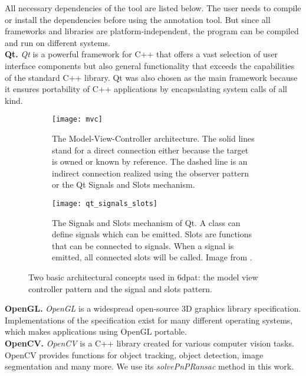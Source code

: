 All necessary dependencies of the tool are listed below. The user needs to compile or install the dependencies before using the annotation tool. But since all frameworks and libraries are platform-independent, the program can be compiled and run on different systems. \\

\noindent\textbf{Qt.} \textit{Qt} \cite{qt} is a powerful framework for C++ that offers a vast selection of user interface components but also general functionality that exceeds the capabilities of the standard C++ library. Qt was also chosen as the main framework because it ensures portability of C++ applications by encapsulating system calls of all kind. \\

\begin{figure}[!tbp]
	\centering
	\begin{subfigure}[t]{0.47\textwidth}
		\centering
    	\texttt{[image: mvc]}
    	\caption{The Model-View-Controller architecture. The solid lines stand for a direct connection either because the target is owned or known by reference. The dashed line is an indirect connection realized using the observer pattern or the Qt Signals and Slots mechanism.}
    	\label{fig:mvc}
	\end{subfigure}
	\hfill
	\begin{subfigure}[t]{0.47\textwidth}
	\centering
    	\texttt{[image: qt\_signals\_slots]}
    	\caption{The Signals and Slots mechanism of Qt. A class can define signals which can be emitted. Slots are functions that can be connected to signals. When a signal is emitted, all connected slots will be called. Image from \cite{qt_signals_and_slots}.}
    	\label{fig:qt_signals_slots}
	\end{subfigure}
	\caption{Two basic architectural concepts used in \ac{6dpat}: the model view controller pattern and the signal and slots pattern.}
\end{figure} 

\noindent\textbf{OpenGL.} \textit{OpenGL} \cite{opengl} is a widespread open-source 3D graphics library specification. Implementations of the specification exist for many different operating systems, which makes applications using OpenGL portable. \\

\noindent\textbf{OpenCV.} \textit{OpenCV} \cite{opencv} is a C++ library created for various computer vision tasks. OpenCV provides functions for object tracking, object detection, image segmentation and many more. We use its \textit{solvePnPRansac} method in this work. \\ 

